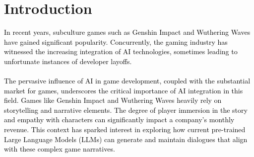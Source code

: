 \documentclass{article}
\begin{document}

\section{Introduction}
\textcolor{black}{In recent years, subculture games such as Genshin Impact and Wuthering Waves have gained significant popularity. Concurrently, the gaming industry has witnessed the increasing integration of AI technologies, sometimes leading to unfortunate instances of developer layoffs.} \\\\
\textcolor{black}{The pervasive influence of AI in game development, coupled with the substantial market for games, underscores the critical importance of AI integration in this field. Games like Genshin Impact and Wuthering Waves heavily rely on storytelling and narrative elements. The degree of player immersion in the story and empathy with characters can significantly impact a company's monthly revenue. This context has sparked interest in exploring how current pre-trained Large Language Models (LLMs) can generate and maintain dialogues that align with these complex game narratives.}
\end{document}
